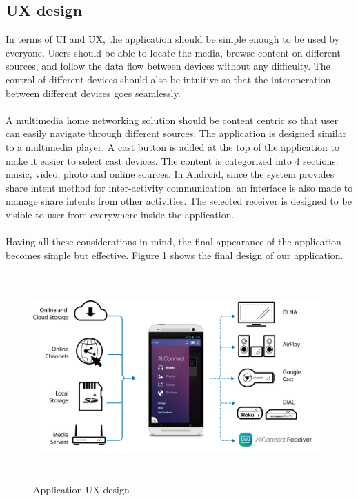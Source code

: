\subsection{UX design}
In terms of UI and UX, the application should be simple enough to be used by everyone. Users should be able to locate the media, browse
content on different sources, and follow the data flow between devices without any difficulty. The control of different devices should also be intuitive so that the interoperation between different devices goes seamlessly.\\
\\
A multimedia home networking solution should be content centric so that user can easily navigate through different sources. The application is designed similar to a multimedia player. A cast button is added at the top of the application to make it easier to select cast devices. The content is categorized into 4 sections: music, video, photo and online sources. In Android, since the system provides share intent method for inter-activity communication, an interface is also made to manage share intents from other activities. The selected receiver is designed to be visible to user from everywhere inside the application. \\
\\
Having all these considerations in mind, the final appearance of the application becomes simple but effective. Figure \ref{chart5} shows the final design of our application.
\begin{figure}[htb]
\centering \includegraphics[height=8cm]{charts/allconnect-app}
\caption{Application UX design \label{chart5}}
\end{figure}

